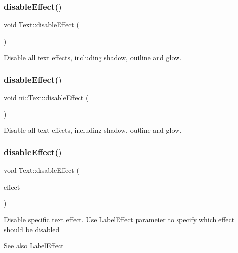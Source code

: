 \subsubsection{\texorpdfstring{disable\+Effect()}{disableEffect()}\hspace{0.1cm}{\footnotesize\ttfamily [1/4]}}
{\footnotesize\ttfamily void Text\+::disable\+Effect (\begin{DoxyParamCaption}{ }\end{DoxyParamCaption})}

Disable all text effects, including shadow, outline and glow. \mbox{\label{classui_1_1Text_ae5bd4cff99d7c103a535af9233d42646}} 
\subsubsection{\texorpdfstring{disable\+Effect()}{disableEffect()}\hspace{0.1cm}{\footnotesize\ttfamily [2/4]}}
{\footnotesize\ttfamily void ui\+::\+Text\+::disable\+Effect (\begin{DoxyParamCaption}{ }\end{DoxyParamCaption})}

Disable all text effects, including shadow, outline and glow. \mbox{\label{classui_1_1Text_a055d25e9e367be1fa2353990b4fd6759}} 
\subsubsection{\texorpdfstring{disable\+Effect()}{disableEffect()}\hspace{0.1cm}{\footnotesize\ttfamily [3/4]}}
{\footnotesize\ttfamily void Text\+::disable\+Effect (\begin{DoxyParamCaption}\item[{\hyperlink{group__base_ga26fd049ca5303e0cf4435208058f32e4}{Label\+Effect}}]{effect }\end{DoxyParamCaption})}

Disable specific text effect. Use Label\+Effect parameter to specify which effect should be disabled.

\begin{DoxySeeAlso}{See also}
{\ttfamily \hyperlink{group__base_ga26fd049ca5303e0cf4435208058f32e4}{Label\+Effect}} 
\end{DoxySeeAlso}
\mbox{\label{classui_1_1Text_aff721ec214ba8a01854e584b060c5f7c}} 
